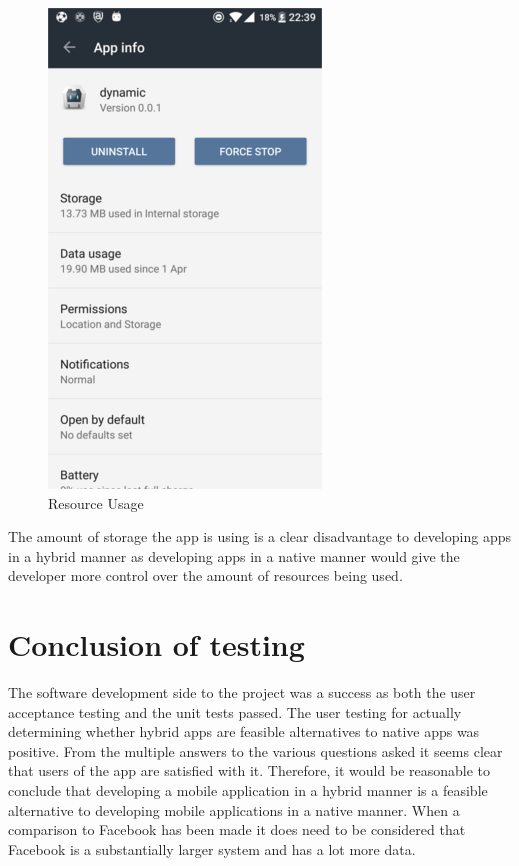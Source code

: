 \begin{center}
\begin{figure}[H]
\includegraphics[scale=0.5]{images/usage}
\caption{Resource Usage}
\end{figure}
\end{center}

The amount of storage the app is using is a clear disadvantage to developing apps in a hybrid manner as developing apps in a native manner would give the developer more control over the amount of resources being used.

\section{Conclusion of testing}
The software development side to the project was a success as both the user acceptance testing and the unit tests passed. The user testing for actually determining whether hybrid apps are feasible alternatives to native apps was positive. From the multiple answers to the various questions asked it seems clear that users of the app are satisfied with it. Therefore, it would be reasonable to conclude that developing a mobile application in a hybrid manner is a feasible alternative to developing mobile applications in a native manner. When a comparison to Facebook has been made it does need to be considered that Facebook is a substantially larger system and has a lot more data. 

